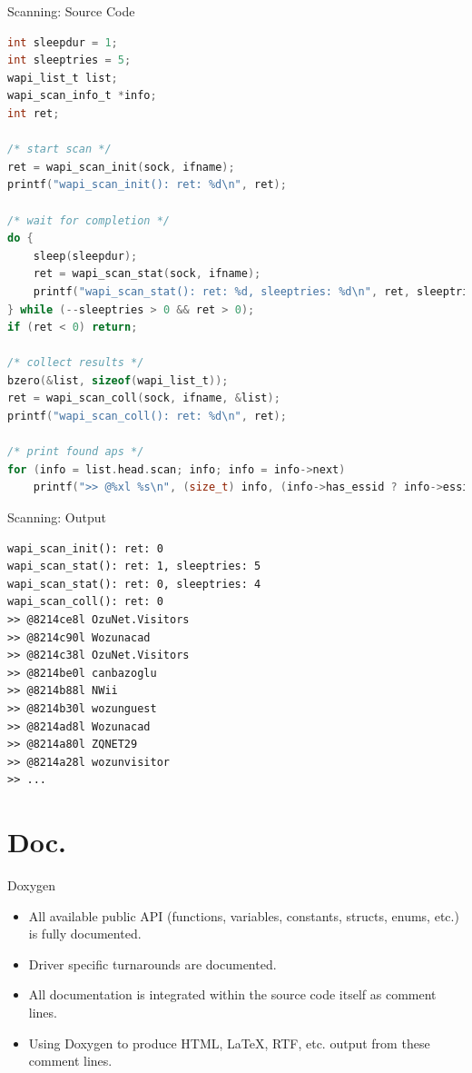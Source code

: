 \documentclass[turkish,12pt,red,compress,mathserif]{beamer}
\begin{document}
\begin{frame}[fragile]{Scanning: Source Code}
  \begin{lstlisting}[language=c]
int sleepdur = 1;
int sleeptries = 5;
wapi_list_t list;
wapi_scan_info_t *info;
int ret;

/* start scan */
ret = wapi_scan_init(sock, ifname);
printf("wapi_scan_init(): ret: %d\n", ret);

/* wait for completion */
do {
    sleep(sleepdur);
    ret = wapi_scan_stat(sock, ifname);
    printf("wapi_scan_stat(): ret: %d, sleeptries: %d\n", ret, sleeptries);
} while (--sleeptries > 0 && ret > 0);
if (ret < 0) return;

/* collect results */
bzero(&list, sizeof(wapi_list_t));
ret = wapi_scan_coll(sock, ifname, &list);
printf("wapi_scan_coll(): ret: %d\n", ret);

/* print found aps */
for (info = list.head.scan; info; info = info->next)
    printf(">> @%xl %s\n", (size_t) info, (info->has_essid ? info->essid : ""));
  \end{lstlisting}
\end{frame}

\begin{frame}[fragile]{Scanning: Output}
  \begin{lstlisting}
wapi_scan_init(): ret: 0
wapi_scan_stat(): ret: 1, sleeptries: 5
wapi_scan_stat(): ret: 0, sleeptries: 4
wapi_scan_coll(): ret: 0
>> @8214ce8l OzuNet.Visitors
>> @8214c90l Wozunacad
>> @8214c38l OzuNet.Visitors
>> @8214be0l canbazoglu
>> @8214b88l NWii
>> @8214b30l wozunguest
>> @8214ad8l Wozunacad
>> @8214a80l ZQNET29
>> @8214a28l wozunvisitor
>> ...
  \end{lstlisting}
\end{frame}


\section{Doc.}

\begin{frame}{Doxygen}
  \begin{itemize}
  \item All available public API (functions, variables, constants, structs,
    enums, etc.) is fully documented.
  \item Driver specific turnarounds are documented.
  \item All documentation is integrated within the source code itself as comment
    lines.
  \item Using Doxygen to produce HTML, LaTeX, RTF, etc. output from these
    comment lines.
  \end{itemize}
\end{frame}
\end{document}
